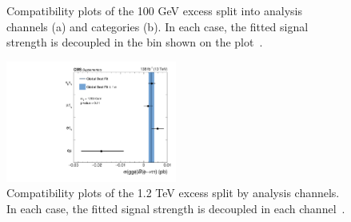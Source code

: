 \begin{figure}[!hbtp]
\centering
\caption[Plots of the compatibility of the 100 GeV excess across the channels and categories.]{Compatibility plots of the 100 GeV excess split into analysis channels (a) and categories (b). In each case, the fitted signal strength is decoupled in the bin shown on the plot~\cite{CMS:2022rbd}.}
\label{fig:low_mass_compatibility}
\end{figure}

\begin{figure}[!hbtp]
\centering
    \includegraphics[width=0.5\textwidth]{Figures/ccc_fit_result_mH1200_per-channel.pdf}
\caption[Plots of the compatibility of the 1.2 TeV excess across the channels.]{Compatibility plots of the 1.2 TeV excess split by analysis channels. In each case, the fitted signal strength is decoupled in each channel~\cite{CMS:2022rbd}.}
\label{fig:high_mass_compatibility}
\end{figure}

